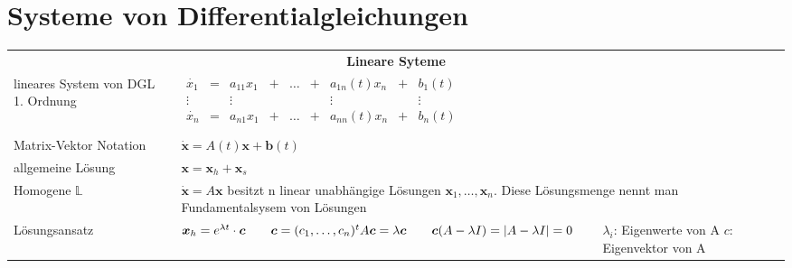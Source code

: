 \section{Systeme von Differentialgleichungen}
	\begin{tabularx}{\columnwidth}{p{3cm}XX}
		\hline 
		\multicolumn{3}{c}{\textbf{Lineare Syteme}}\\
	lineares System von DGL 1. Ordnung &		
	$\begin{matrix} \dot{x_1} &=& a_{11}x_1 &+&\dots&+&a_{1n}(t)x_n&+&b_1(t)\\ 
	                \vdots    & & \vdots    & &     & &\vdots      & &\vdots \\
	                \dot{x_n} &=& a_{n1}x_1 &+&\dots&+&a_{nn}(t)x_n&+&b_n(t)\\ \end{matrix}$&\\

	Matrix-Vektor Notation & $\bm{\dot x} = A(t)\bm x + \bm b(t)$ & \\
	allgemeine Lösung & $\bm x = \bm x_h + \bm x_s$ & \\
	\hdashline 
	Homogene $\mathbb L$ & \multicolumn{2}{p{14cm}}{$\bm{\dot x} = A \bm x$ besitzt n linear unabhängige Lösungen $\bm x_1,\dots, \bm x_n$. Diese Lösungsmenge nennt man Fundamentalsysem von Lösungen}\\
	Lösungsansatz & $\bm x_h = e^{\lambda t}\cdot \bm c \qquad \bm c = (c_1,\dots,c_n)^t \newline A\bm c = \lambda \bm c \qquad \bm c(A-\lambda I) = |A-\lambda I| = 0$ &
	$\lambda_i$: Eigenwerte von A \newline $c$: Eigenvektor von A\\
	

\end{tabularx}
